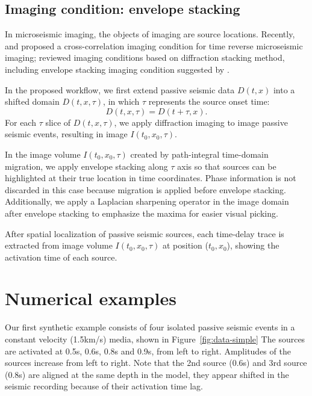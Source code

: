 \subsection{Imaging condition: envelope stacking}
In microseismic imaging, the objects of imaging are source locations.
Recently, \cite{sun2015investigating} and \cite{nakata2016reverse} proposed a cross-correlation imaging condition for time reverse microseismic imaging; \cite{trojanowski2016comparison} reviewed imaging conditions based on diffraction stacking method, including envelope stacking imaging condition suggested by \cite{gharti2010automated}.

In the proposed workflow, we first extend passive seismic data $D(t,x)$ into a shifted domain $D(t,x,\tau)$, in which $\tau$ represents the source onset time:
\begin{equation}
\label{eq:spra}
D(t,x,\tau) = D(t+\tau,x).
\end{equation}
For each $\tau$ slice of $D(t,x,\tau)$, we apply diffraction imaging to image passive seismic events, resulting in image $I(t_0,x_0,\tau)$.

In the image volume $I(t_0,x_0,\tau)$ created by path-integral time-domain migration, we apply envelope stacking along $\tau$ axis so that sources can be highlighted at their true location in time coordinates.
Phase information is not discarded in this case because migration is applied before envelope stacking.
Additionally, we apply a Laplacian sharpening operator in the image domain after envelope stacking to emphasize the maxima for easier visual picking.

After spatial localization of passive seismic sources, each time-delay trace is extracted from image volume $I(t_0,x_0,\tau)$ at position ($t_0,x_0$), showing the activation time of each source.

\section{Numerical examples}
Our first synthetic example consists of four isolated passive seismic events in a constant velocity (1.5km/s) media, shown in Figure~\ref{fig:data-simple}
The sources are activated at 0.5s, 0.6s, 0.8s and 0.9s, from left to right.
Amplitudes of the sources increase from left to right.
Note that the 2nd source (0.6s) and 3rd source (0.8s) are aligned at the same depth in the model, they appear shifted in the seismic recording because of their activation time lag.

